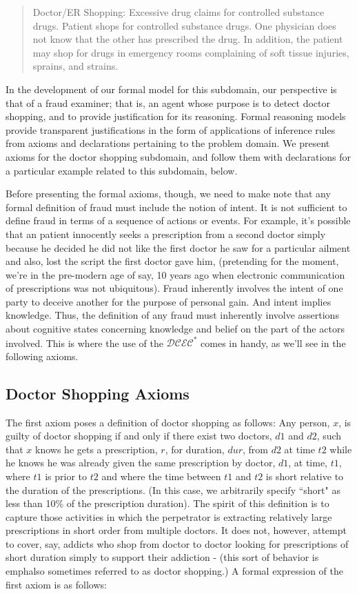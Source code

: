 \blockquote{Doctor/ER Shopping: 
Excessive drug claims for controlled substance drugs. Patient shops for controlled 
substance drugs. One physician does not know that the other has prescribed the drug. In 
addition, the patient may shop for drugs in emergency rooms complaining of soft tissue 
injuries, sprains, and strains.\cite{acfe_manual_2011_doctorshopping}}

In the development of our formal model for this subdomain, our perspective is that of a fraud examiner; that is, an agent whose purpose is to detect doctor shopping, and to provide justification for its reasoning.  Formal reasoning models provide transparent justifications in the form of applications of inference rules from axioms and declarations pertaining to the problem domain.  We present axioms for the doctor shopping subdomain, and follow them with declarations for a particular example related to this subdomain, below.

Before presenting the formal axioms, though, we need to make note that any formal definition of fraud must include the notion of intent.  It is not sufficient to define fraud in terms of a sequence of actions or events.  For example, it's possible that an patient innocently seeks a prescription from a second doctor simply because he decided he did not like the first doctor he saw for a particular ailment and also, lost the script the first doctor gave him, (pretending for the moment, we're in the pre-modern age of say, 10 years ago when electronic communication of prescriptions was not ubiquitous).  Fraud inherently involves the intent of one party to deceive another for the purpose of personal gain.  And intent implies knowledge.  Thus, the definition of any fraud must inherently involve assertions about cognitive states concerning knowledge and belief on the part of the actors involved.  This is where the use of the $\mathcal{DCEC}^\ast$ comes in handy, as we'll see in the following axioms.

\subsection{Doctor Shopping Axioms}

The first axiom poses a definition of doctor shopping as follows:  Any person, $x$, is guilty of doctor shopping if and only if there exist two doctors, $d1$ and $d2$, such that $x$ knows he gets a prescription, $r$, for duration, $dur$, from $d2$ at time $t2$ while he knows he was already given the same prescription by doctor, $d1$, at time, $t1$, where $t1$ is prior to $t2$ and where the time between $t1$ and $t2$ is short relative to the duration of the prescriptions.  (In this case, we arbitrarily specify ``short" as less than 10\% of the prescription duration).  The spirit of this definition is to capture those activities in which the perpetrator is extracting relatively large prescriptions in short order from multiple doctors.  It does not, however, attempt to cover, say, addicts who shop from doctor to doctor looking for prescriptions of short duration simply to support their addiction - (this sort of behavior is emph{also} sometimes referred to as doctor shopping.)  A formal expression of the first axiom is as follows:

